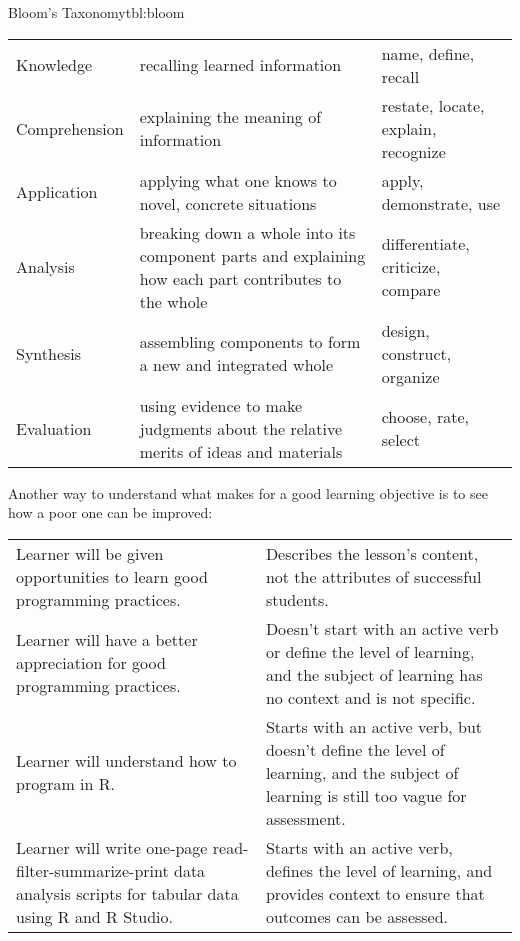 \begin{tbllbl}{Bloom's Taxonomy}{tbl:bloom}

\begin{tabular}{lll}
Knowledge
& recalling learned information
& name, define, recall
\\

Comprehension
& explaining the meaning of information
& restate, locate, explain, recognize
\\

Application
& applying what one knows to novel, concrete situations
& apply, demonstrate, use
\\

Analysis
& breaking down a whole into its component parts and explaining how each part contributes to the whole
& differentiate, criticize, compare
\\

Synthesis
& assembling components to form a new and integrated whole
& design, construct, organize
\\

Evaluation
& using evidence to make judgments about the relative merits of ideas and materials
& choose, rate, select
\\

\end{tabular}

\end{tbllbl}

Another way to understand what makes for a good learning objective
is to see how a poor one can be improved:

\begin{tabular}{ll}

Learner will be given opportunities to learn good programming practices.
&
Describes the lesson's content, not the attributes of successful students.
\\

Learner will have a better appreciation for good programming practices.
&
Doesn't start with an active verb or define the level of learning,
and the subject of learning has no context and is not specific.
\\

Learner will understand how to program in R.
&
Starts with an active verb, but doesn't define the level of learning,
and the subject of learning is still too vague for assessment.
\\

Learner will write one-page read-filter-summarize-print data analysis
scripts for tabular data using R and R Studio.
&
Starts with an active verb, defines the level of learning,
and provides context to ensure that outcomes can be assessed.
\\

\end{tabular}

